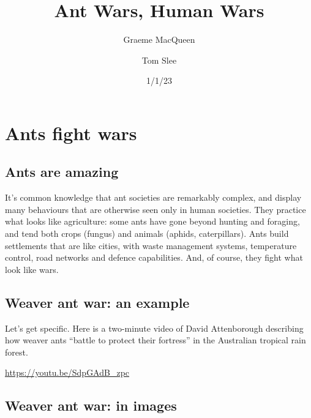 \documentclass[
  letterpaper,
  DIV=11,
  numbers=noendperiod]{scrartcl}
\title{Ant Wars, Human Wars}
\author{Graeme MacQueen \and Tom Slee}
\date{1/1/23}
\renewcommand*\contentsname{Table of contents}
\newcommand\contentsname{Table of contents}
\begin{document}
\maketitle
\ifdefined\Shaded\renewenvironment{Shaded}{\begin{tcolorbox}[frame hidden, boxrule=0pt, breakable, interior hidden, borderline west={3pt}{0pt}{shadecolor}, enhanced, sharp corners]}{\end{tcolorbox}}\fi

\renewcommand*\contentsname{Contents}
{
\hypersetup{linkcolor=}
\setcounter{tocdepth}{3}
\tableofcontents
}
\hypertarget{ants-fight-wars}{%
\section{Ants fight wars}\label{ants-fight-wars}}

\hypertarget{ants-are-amazing}{%
\subsection{Ants are amazing}\label{ants-are-amazing}}

It's common knowledge that ant societies are remarkably complex, and
display many behaviours that are otherwise seen only in human societies.
They practice what looks like agriculture: some ants have gone beyond
hunting and foraging, and tend both crops (fungus) and animals (aphids,
caterpillars). Ants build settlements that are like cities, with waste
management systems, temperature control, road networks and defence
capabilities. And, of course, they fight what look like wars.

\hypertarget{weaver-ant-war-an-example}{%
\subsection{Weaver ant war: an
example}\label{weaver-ant-war-an-example}}

Let's get specific. Here is a two-minute video of David Attenborough
describing how weaver ants ``battle to protect their fortress'' in the
Australian tropical rain forest.

\url{https://youtu.be/SdpGAdB_zpc}

\hypertarget{weaver-ant-war-in-images}{%
\subsection{Weaver ant war: in images}\label{weaver-ant-war-in-images}}
\end{document}
